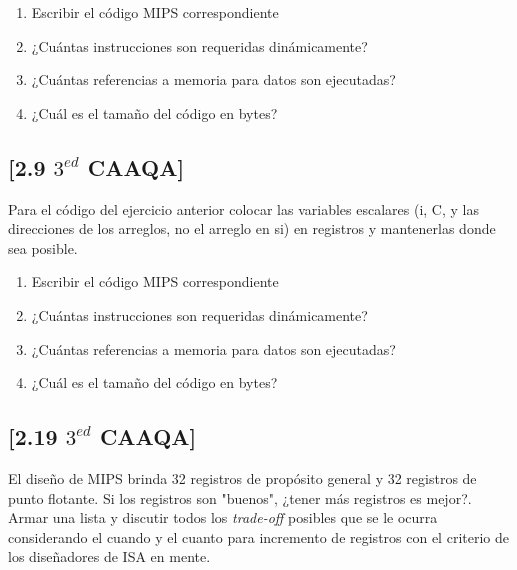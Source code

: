 \begin{enumerate}
 \item Escribir el código MIPS correspondiente
 \item ¿Cuántas instrucciones son requeridas dinámicamente?
 \item ¿Cuántas referencias a memoria para datos son ejecutadas?
 \item ¿Cuál es el tamaño del código en bytes?
\end{enumerate}

  
\subsection{[2.9 $3^{ed}$ CAAQA]}
Para el código del ejercicio anterior colocar las variables escalares (i, C, y las direcciones de los arreglos, no el arreglo en si) en registros y mantenerlas donde sea posible.

\begin{enumerate}
 \item Escribir el código MIPS correspondiente
 \item ¿Cuántas instrucciones son requeridas dinámicamente?
 \item ¿Cuántas referencias a memoria para datos son ejecutadas?
 \item ¿Cuál es el tamaño del código en bytes?
\end{enumerate}

\subsection{[2.19 $3^{ed}$ CAAQA]}

El diseño de MIPS brinda 32 registros de propósito general y 32 registros de punto flotante. Si los registros son "buenos", ¿tener más registros es mejor?. Armar una lista y discutir todos los \textit{trade-off} posibles que se le ocurra considerando el cuando y el cuanto para incremento de registros con el criterio de los diseñadores de ISA en mente. 

